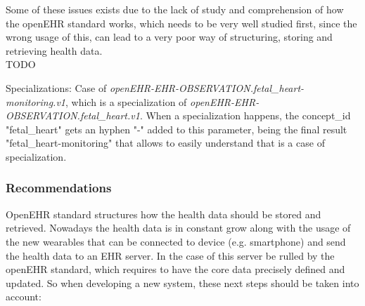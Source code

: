\documentclass[mim_thesis.tex]{subfiles}
\begin{document}
Some of these issues exists due to the lack of study and comprehension of how the openEHR standard works, which needs to be very well studied first, since the wrong usage of this, can lead to a very poor way of structuring, storing and retrieving health data. \\

TODO

Specializations: Case of \textit{openEHR-EHR-OBSERVATION.fetal\_heart-monitoring.v1}, which is a specialization of \textit{openEHR-EHR-OBSERVATION.fetal\_heart.v1}. When a specialization happens, the concept\_id "fetal\_heart" gets an hyphen "-" added to this parameter, being the final result "fetal\_heart-monitoring" that allows to easily understand that is a case of specialization.

\subsubsection{Recommendations}
OpenEHR standard structures how the health data should be stored and retrieved. Nowadays the health data is in constant grow along with the usage of the new wearables that can be connected to device (e.g. smartphone) and send the health data to an EHR server. In the case of this server be rulled by the openEHR standard, which requires to have the core data precisely defined and updated. So when developing a new system, these next steps should be taken into account:
\end{document}
